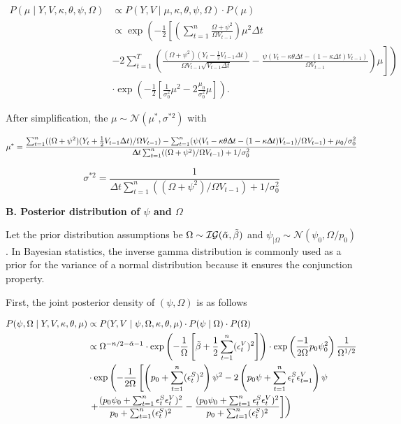 \documentclass[12pt,a4paper]{article}
\numberwithin{equation}{section}
\begin{document}
\begin{align*}
P(\mu \mid Y, V, \kappa, \theta, \psi, \Omega) & \propto P(Y, V \mid \mu, \kappa, \theta, \psi, \Omega) \cdot P(\mu) \\
& \propto\exp\left(-\frac{1}{2} \left[\left(\sum_{t=1}^n \frac{\Omega + \psi^2}{\Omega V_{t-1}}\right) \mu^2 \Delta t \right. \right. \\ 
& \left. \left. - 2\sum_{t=1}^T \left(\frac{(\Omega + \psi^2)(Y_t - \frac{1}{2} V_{t-1} \Delta t)}{\Omega V_{t-1} \sqrt{V_{t-1} \Delta t}} - \frac{\psi \left(V_t - \kappa \theta \Delta t - (1 - \kappa \Delta t)V_{t-1} \right)}{\Omega V_{t-1}} \right) \mu \right] \right) \\
& \cdot \exp\left(-\frac{1}{2} \left[\frac{1}{\sigma_0^2} \mu^2 - 2 \frac{\mu_0}{\sigma_0^2} \mu \right] \right).
\end{align*}

After simplification, the $\mu \sim \mathcal{N}(\mu^*, \sigma^{*2})$ with

\[
\mu^* = \frac{\sum_{t=1}^n ((\Omega + \psi^2) (Y_t + \frac{1}{2} V_{t-1} \Delta t)/\Omega V_{t-1}) - \sum_{t=1}^n (\psi (V_t - \kappa \theta \Updelta t - (1 - \kappa \Updelta t)V_{t-1})/\Omega V_{t-1}) + \mu_0/\sigma_0^2}{\Updelta t \sum_{t=1}^n ((\Omega + \psi^2) / \Omega V_{t-1}) + 1 / \sigma_0^2}
\]

\[
\sigma^{*2} = \frac{1}{\Delta t \sum_{t=1}^n ((\Omega + \psi^2) / \Omega V_{t-1}) + 1 / \sigma_0^2}
\]

\textbf{B. Posterior distribution of $\psi$ and $\Omega$}

Let the prior distribution assumptions be $\Omega\sim \mathcal{IG}(\Tilde{\alpha}, \Tilde{\beta})$ and $\psi_{|\Omega} \sim \mathcal{N}(\psi_0, \Omega/p_0)$. In Bayesian statistics, the inverse gamma distribution is commonly used as a prior for the variance of a normal distribution because it ensures the conjunction property.

First, the joint posterior density of $(\psi,\Omega)$ is as follows

\begin{align*}
P(\psi, \Omega \mid Y, V, \kappa, \theta, \mu) &\propto P(Y, V \mid \psi, \Omega, \kappa, \theta, \mu) \cdot P(\psi \mid \Omega) \cdot P(\Omega) \\
&\propto \Omega^{-n/2-\Tilde{\alpha}-1} \cdot \exp \left( -\frac{1}{\Omega} \left[\Tilde{\beta} + \frac{1}{2}\sum_{t=1}^n (\epsilon_t^V)^2\right]\right) \cdot \exp \left(\frac{-1}{2\Omega}p_0\psi_0^2\right)\frac{1}{\Omega^{1/2}}\\
&\cdot \exp \left( -\frac{1}{2 \Omega} \left[ \left( p_0 + \sum_{t=1}^n (\epsilon_t^S)^2 \right) \psi^2 -2 \left(p_0 \psi + \sum_{t=1}^n \epsilon_t^S \epsilon_{t=1}^V \right) \psi \right. \right.\\
&\left. \left. + \frac{(p_0 \psi_0 + \sum_{t=1}^n \epsilon_t^S \epsilon_t^V )^2 }{p_0 + \sum_{t=1}^n (\epsilon_t^S )^2 } - \frac{(p_0 \psi_0 + \sum_{t=1}^n \epsilon_t^S \epsilon_t^V )^2 }{p_0 + \sum_{t=1}^n (\epsilon_t^S )^2 }\right]\right)
\end{align*}
\end{document}
